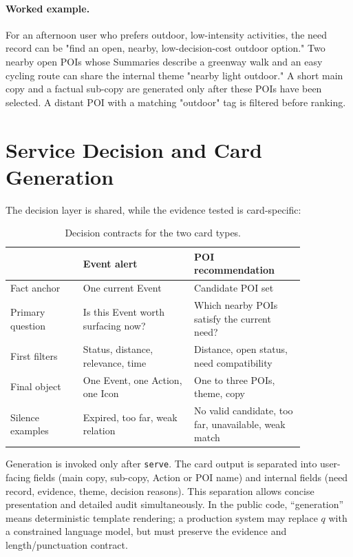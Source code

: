 \documentclass[10pt]{article}
\newcommand{\serve}{\texttt{serve}}
\begin{document}
\paragraph{Worked example.}
For an afternoon user who prefers outdoor, low-intensity activities, the need record can be "find an open, nearby, low-decision-cost outdoor option." Two nearby open POIs whose Summaries describe a greenway walk and an easy cycling route can share the internal theme "nearby light outdoor." A short main copy and a factual sub-copy are generated only after these POIs have been selected. A distant POI with a matching "outdoor" tag is filtered before ranking.

\section{Service Decision and Card Generation}

The decision layer is shared, while the evidence tested is card-specific:

\begin{table}[t]
\centering
\small
\caption{Decision contracts for the two card types.}
\label{tab:contracts}
\begin{tabular}{p{0.21\linewidth}p{0.32\linewidth}p{0.32\linewidth}}
\toprule
 & Event alert & POI recommendation \\
\midrule
Fact anchor & One current Event & Candidate POI set \\
Primary question & Is this Event worth surfacing now? & Which nearby POIs satisfy the current need? \\
First filters & Status, distance, relevance, time & Distance, open status, need compatibility \\
Final object & One Event, one Action, one Icon & One to three POIs, theme, copy \\
Silence examples & Expired, too far, weak relation & No valid candidate, too far, unavailable, weak match \\
\bottomrule
\end{tabular}
\end{table}

Generation is invoked only after \serve{}. The card output is separated into user-facing fields (main copy, sub-copy, Action or POI name) and internal fields (need record, evidence, theme, decision reasons). This separation allows concise presentation and detailed audit simultaneously. In the public code, ``generation'' means deterministic template rendering; a production system may replace $q$ with a constrained language model, but must preserve the evidence and length/punctuation contract.
\end{document}
